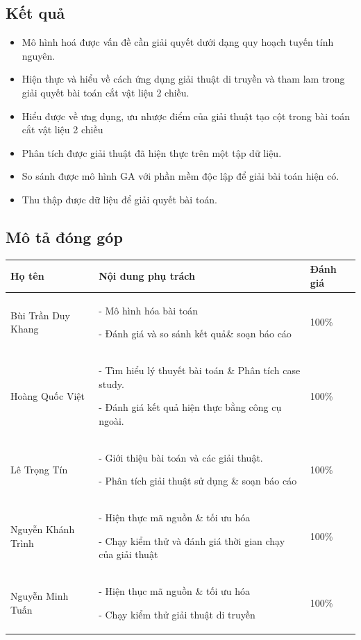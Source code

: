 \documentclass[a4paper]{article}
\begin{document}
\subsection{Kết quả}
\begin{itemize}
    \item Mô hình hoá được vấn đề cần giải quyết dưới dạng quy hoạch tuyến tính nguyên.

    \item Hiện thực và hiểu về cách ứng dụng giải thuật di truyền và tham lam trong giải quyết bài toán cắt vật liệu 2 chiều.

    \item Hiểu được về ưng dụng, ưu nhược điểm của giải thuật tạo cột trong bài toán cắt vật liệu 2 chiều

    \item Phân tích được giải thuật đã hiện thực trên một tập dữ liệu.

    \item So sánh được mô hình GA với phần mềm độc lập để giải bài toán hiện có.

    \item Thu thập được dữ liệu để giải quyết bài toán.
 
\end{itemize}

\subsection{Mô tả đóng góp}
\noindent
\begin{tabularx}{\textwidth}{| m{4.5cm} | X | m{2cm} |}
  \hline
  \textbf{\centering Họ tên} & \textbf{Nội dung phụ trách} & \textbf{Đánh giá} \\
  \hline
  Bùi Trần Duy Khang & - Mô hình hóa bài toán 
  
  - Đánh giá và so sánh kết quả\& soạn báo cáo& \cellcolor{green!30}100\% \\
  \hline
  Hoàng Quốc Việt & - Tìm hiểu lý thuyết bài toán \& Phân tích case study. 
  
  - Đánh giá kết quả hiện thực bằng công cụ ngoài.& \cellcolor{green!30}100\% \\
  \hline
  Lê Trọng Tín  & - Giới thiệu bài toán và các giải thuật.
  
  - Phân tích giải thuật sử dụng \& soạn báo cáo & \cellcolor{green!30}100\% \\
  \hline
  Nguyễn Khánh Trình & - Hiện thực mã nguồn \& tối ưu hóa 
  
  - Chạy kiểm thử và đánh giá thời gian chạy của giải thuật& \cellcolor{green!30}100\% \\
  \hline
  Nguyễn Minh Tuấn & - Hiện thục mã nguồn \& tối ưu hóa
  
  - Chạy kiểm thử giải thuật di truyền& \cellcolor{green!30}100\% \\
  \hline
\end{tabularx}
\end{document}
